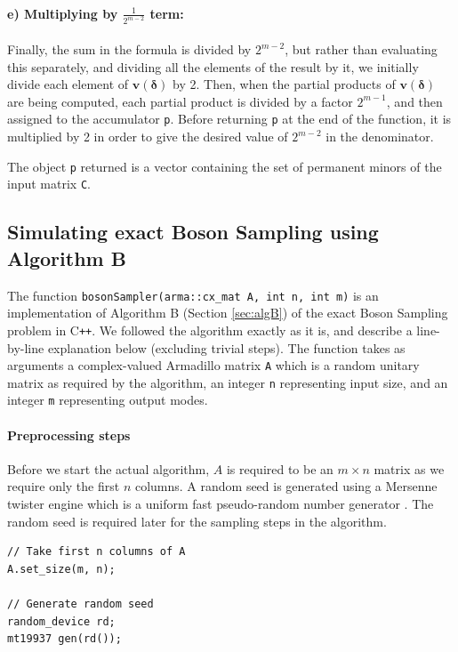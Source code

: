 \documentclass[11pt]{article}
\theoremstyle{theorem}
\theoremstyle{remark}
\theoremstyle{plain}
\theoremstyle{definition}
\begin{document}
\paragraph{e) Multiplying by $\frac{1}{2^{m-2}}$ term:} Finally, the sum in the formula is divided by $2^{m-2}$, but rather than evaluating this separately, and dividing all the elements of the result by it, we initially divide each element of $\mathbf{v}(\mathbf{\delta})$ by 2. Then, when the partial products of $\mathbf{v}(\mathbf{\delta})$ are being computed, each partial product is divided by a factor $2^{m-1}$, and then assigned to the accumulator \texttt{p}. Before returning  \texttt{p} at the end of the function, it is multiplied by 2 in order to give the desired value of $2^{m-2}$ in the denominator.

The object \texttt{p} returned is a vector containing the set of permanent minors of the input matrix \texttt{C}.

\subsection{Simulating exact Boson Sampling using Algorithm B}
The function \texttt{bosonSampler(arma::cx_mat A, int n, int m)} is an implementation of Algorithm B (Section \ref{sec:algB}) of the exact Boson Sampling problem in C\texttt{++}. We followed the algorithm exactly as it is, and describe a line-by-line explanation below (excluding trivial steps). The function takes as arguments a complex-valued Armadillo matrix \texttt{A} which is a random unitary matrix as required by the algorithm, an integer \texttt{n} representing input size, and an integer \texttt{m} representing output modes.
\paragraph{Preprocessing steps} Before we start the actual algorithm, $A$ is required to be an $m \times n$ matrix as we require only the first $n$ columns. A random seed is generated using a Mersenne twister engine which is a uniform fast pseudo-random number generator \cite{matsumoto1998}. The random seed is required later for the sampling steps in the algorithm.
\begin{verbatim}
// Take first n columns of A
A.set_size(m, n);

// Generate random seed
random_device rd;
mt19937 gen(rd());
\end{verbatim}
\end{document}
